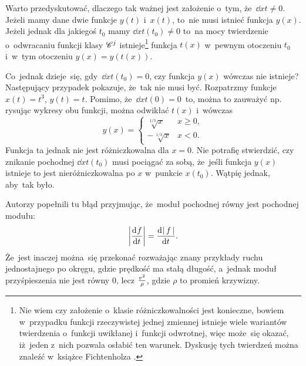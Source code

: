 \documentclass[a4paper,11pt]{article}
\begin{document}

\vspace{\spaceFour}


\start {} Warto przedyskutować, dlaczego tak ważnej jest
założenie o~tym, że~$\dd{}{ x }{ t } \neq 0$. Jeżeli mamy dane dwie
funkcje $y( t )$ i~$x( t )$, to~nie musi istnieć funkcja $y( x )$.
Jeżeli jednak dla jakiegoś $t_{ 0 }$ mamy
$\dd{}{ x }{ t }( t_{ 0 } ) \neq 0$ to~na mocy twierdzenie
o~odwracaniu funkcji klasy $\mathcal{C}^{ j }$ istnieje\footnote{Nie wiem czy
  założenie o~klasie różniczkowalności jest konieczne, bowiem
  w~przypadku funkcji rzeczywistej jednej zmiennej istnieje wiele
  wariantów twierdzenia o~funkcji uwikłanej i~funkcji odwrotnej, więc
  może~się okazać, iż~jeden z~nich pozwala osłabić ten warunek.
  Dyskusję tych twierdzeń można znaleźć w~książce Fichtenholza
  \cite{Fic05a}.} funkcja $t( x )$ w~pewnym otoczeniu $t_{ 0 }$
i~w~tym otoczeniu $y( x ) = y( t( x ) )$.

Co~jednak dzieje~się, gdy~$\dd{}{ x }{ t }( t_{ 0 } ) = 0$, czy
funkcja $y( x )$ wówczas nie istnieje? Następujący przypadek pokazuje,
że~tak nie musi być. Rozpatrzmy funkcje $x( t ) = t^{ 3 }$,
$y( t ) = t$. Pomimo, że~$\dd{}{ x }{ t }( 0 ) = 0$~to, można to
zauważyć np. rysując wykresy obu funkcji, można odwikłać $t( x )$
i~wówczas
\begin{equation*}
  y( x ) =
  \begin{cases}
    \sqrt[1 / 3]{ x } & x \geq 0, \\
    -\sqrt[1 / 3]{ x } & x < 0.
  \end{cases}
\end{equation*}
Funkcja ta jednak nie jest różniczkowalna dla $x = 0$. Nie potrafię
stwierdzić, czy znikanie pochodnej $\dd{}{ x }{ t }( t_{ 0 } )$ musi
pociągać za sobą, że~jeśli funkcja $y( x )$ istnieje to jest
nieróżniczkowalna po $x$ w~punkcie $x( t_{ 0 } )$. Wątpię jednak,
aby~tak było.

\vspace{\spaceFour}


\start {} Autorzy popełnili tu błąd przyjmując, że~moduł
pochodnej równy jest pochodnej modułu:
\begin{displaymath}
  \left| \frac{ \mathrm{d}^{  } {  f  } }{ \mathrm{d} {  t  }^{  } } \right| = \frac{ \mathrm{d}^{  } {  \left| \,  f  \, \right|  } }{ \mathrm{d} {  t  }^{  } }.
\end{displaymath}
Że~jest inaczej można~się przekonać rozważając znany przykłady ruchu
jednostajnego po okręgu, gdzie prędkość ma stałą długość, a~jednak
moduł przyśpieszenia nie jest równy 0, lecz $\frac{ v^{ 2 } }{ \rho }$,
gdzie $\rho$ to promień krzywizny.
\end{document}
